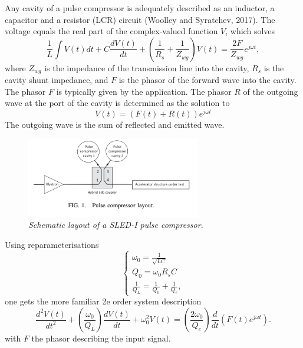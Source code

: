 \documentclass[12pt]{amsart}
\begin{document}
Any cavity of a pulse compressor is adequately described as 
an inductor, a capacitor and a resistor (LCR) circuit (Woolley and Syratchev, 2017).
The voltage equals the real part of the complex-valued function $V$, which solves 
\begin{equation}
	\frac{1}{L} \int V(t) dt + C\dfrac{dV(t)}{dt} + \left(\frac{1}{R_s} + \frac{1}{Z_{wg}}\right) V(t)
	= 
	\frac{2F}{Z_{wg}} e^{j\omega t},
	\label{eq.lcr}
\end{equation}
where $Z_{wg}$ is the impedance of the transmission line into the cavity,
$R_s$ is the cavity shunt impedance,
and $F$ is the phasor of the forward wave into the cavity.
The phasor $F$ is typically given by the application.
The phasor $R$ of the outgoing wave at the port of the cavity is determined as the solution to 
\begin{equation}
	V(t) = \left(F(t) + R(t)\right) e^{j\omega t}
	\label{eq.lcr2}
\end{equation}
The outgoing wave is the sum of reflected and emitted wave.

\begin{figure}[htbp] %
   \centering
   \includegraphics[width=3in]{im/pc2.png} 
   \caption{\em Schematic layout of a SLED-I pulse compressor.}
   \label{fig:pc2}
\end{figure}

Using reparameterisations  
\begin{equation}
	\begin{cases}
		\omega_0 = \frac{1}{\sqrt{LC}} \\
		Q_0 = \omega_0 R_s C \\
		\frac{1}{Q_L} = \frac{1}{Q_0} + \frac{1}{Q_e}, 
	\end{cases}
	\label{eq.lcr1b}
\end{equation}
one gets the more familiar 2e order system description
\begin{equation}
	\dfrac{d^2 V(t)}{ dt^2} 
	+ \left(\frac{\omega_0}{Q_L}\right)\dfrac{dV(t)}{ dt} 
	+ \omega_0^2 V(t)
	=
	\left(\frac{2\omega_0}{Q_e}\right) \dfrac{d}{dt} \left(F(t) e^{j\omega t}\right).
	\label{eq.lcr3}
\end{equation}
with $F$ the phasor describing the input signal.
\end{document}
